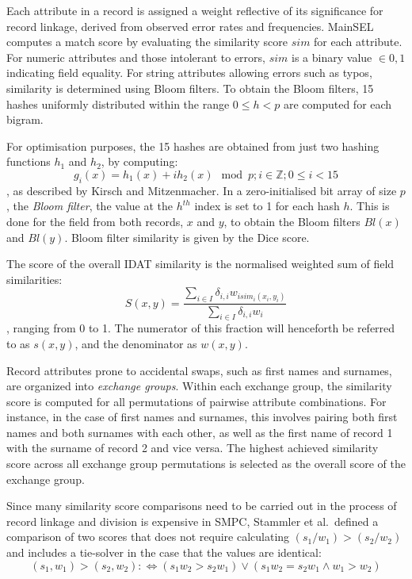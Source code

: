 Each attribute in a record is assigned a weight reflective of its significance for record linkage, derived from observed error rates and frequencies. MainSEL computes a match score by evaluating the similarity score $sim$ for each attribute. For numeric attributes and those intolerant to errors, $sim$ is a binary value $\in {0, 1}$ indicating field equality. For string attributes allowing errors such as typos, similarity is determined using Bloom filters. To obtain the Bloom filters, 15 hashes uniformly distributed within the range $0 \le h < p$ are computed for each bigram.

For optimisation purposes, the 15 hashes are obtained from just two hashing functions $h_1$ and $h_2$,
by computing:
\[g_i(x)=h_1(x)+ih_2(x) \mod p; i \in \mathbb{Z}; 0 \le i < 15\]
, as described by Kirsch and Mitzenmacher. %
In a zero-initialised bit array of size $p$, the \textit{Bloom filter}, the value at the $h^{th}$ index is set to 1 for each hash $h$.
This is done for the field from both records, $x$ and $y$, to obtain the Bloom filters $Bl(x)$ and $Bl(y)$.
Bloom filter similarity is given by the Dice score.

The score of the overall IDAT similarity is the normalised weighted sum of field similarities:
\[S(x, y)=\frac{\sum\limits_{i\in I}\delta_{i,i}w_{isim_i(x_i, y_i)}}{\sum\limits_{i\in I}\delta_{i,i}w_i}\]
, ranging from 0 to 1.
The numerator of this fraction will henceforth be referred to as $s(x, y)$, and the denominator as $w(x, y)$.

Record attributes prone to accidental swaps, such as first names and surnames, are organized into \textit{exchange groups}.
Within each exchange group, the similarity score is computed for all permutations of pairwise attribute combinations.
For instance, in the case of first names and surnames, this involves pairing both first names and both surnames with each other, as well as the first name of record 1 with the surname of record 2 and vice versa. The highest achieved similarity score across all exchange group permutations is selected as the overall score of the exchange group. %

Since many similarity score comparisons need to be carried out in the process of record linkage and division is expensive in \ac{SMPC}, Stammler et al.\ defined a comparison of two scores that does not require calculating $(s_1/w_1) > (s_2/w_2)$ and includes a tie-solver in the case that the values are identical:
\[(s_1, w_1) > (s_2, w_2) :\iff (s_1 w_2>s_2 w_1) \lor (s_1 w_2 = s_2 w_1 \land w_1 > w_2)\]

